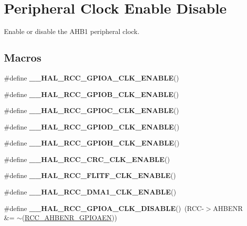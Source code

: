 \hypertarget{group___r_c_c___peripheral___clock___enable___disable}{\section{Peripheral Clock Enable Disable}
\label{group___r_c_c___peripheral___clock___enable___disable}
}


Enable or disable the A\-H\-B1 peripheral clock.  


\subsection*{Macros}
\begin{DoxyCompactItemize}
\item 
\#define {\bfseries \-\_\-\-\_\-\-H\-A\-L\-\_\-\-R\-C\-C\-\_\-\-G\-P\-I\-O\-A\-\_\-\-C\-L\-K\-\_\-\-E\-N\-A\-B\-L\-E}()
\item 
\#define {\bfseries \-\_\-\-\_\-\-H\-A\-L\-\_\-\-R\-C\-C\-\_\-\-G\-P\-I\-O\-B\-\_\-\-C\-L\-K\-\_\-\-E\-N\-A\-B\-L\-E}()
\item 
\#define {\bfseries \-\_\-\-\_\-\-H\-A\-L\-\_\-\-R\-C\-C\-\_\-\-G\-P\-I\-O\-C\-\_\-\-C\-L\-K\-\_\-\-E\-N\-A\-B\-L\-E}()
\item 
\#define {\bfseries \-\_\-\-\_\-\-H\-A\-L\-\_\-\-R\-C\-C\-\_\-\-G\-P\-I\-O\-D\-\_\-\-C\-L\-K\-\_\-\-E\-N\-A\-B\-L\-E}()
\item 
\#define {\bfseries \-\_\-\-\_\-\-H\-A\-L\-\_\-\-R\-C\-C\-\_\-\-G\-P\-I\-O\-H\-\_\-\-C\-L\-K\-\_\-\-E\-N\-A\-B\-L\-E}()
\item 
\#define {\bfseries \-\_\-\-\_\-\-H\-A\-L\-\_\-\-R\-C\-C\-\_\-\-C\-R\-C\-\_\-\-C\-L\-K\-\_\-\-E\-N\-A\-B\-L\-E}()
\item 
\#define {\bfseries \-\_\-\-\_\-\-H\-A\-L\-\_\-\-R\-C\-C\-\_\-\-F\-L\-I\-T\-F\-\_\-\-C\-L\-K\-\_\-\-E\-N\-A\-B\-L\-E}()
\item 
\#define {\bfseries \-\_\-\-\_\-\-H\-A\-L\-\_\-\-R\-C\-C\-\_\-\-D\-M\-A1\-\_\-\-C\-L\-K\-\_\-\-E\-N\-A\-B\-L\-E}()
\item 
\hypertarget{group___r_c_c___peripheral___clock___enable___disable_ga7083e491e6a1e165d064d199304bd2f0}{\#define {\bfseries \-\_\-\-\_\-\-H\-A\-L\-\_\-\-R\-C\-C\-\_\-\-G\-P\-I\-O\-A\-\_\-\-C\-L\-K\-\_\-\-D\-I\-S\-A\-B\-L\-E}()~(R\-C\-C-\/$>$A\-H\-B\-E\-N\-R \&= $\sim$(\hyperlink{group___peripheral___registers___bits___definition_ga8909660b884f126ab1476daac7999619}{R\-C\-C\-\_\-\-A\-H\-B\-E\-N\-R\-\_\-\-G\-P\-I\-O\-A\-E\-N}))}\label{group___r_c_c___peripheral___clock___enable___disable_ga7083e491e6a1e165d064d199304bd2f0}


\end{DoxyCompactItemize}
